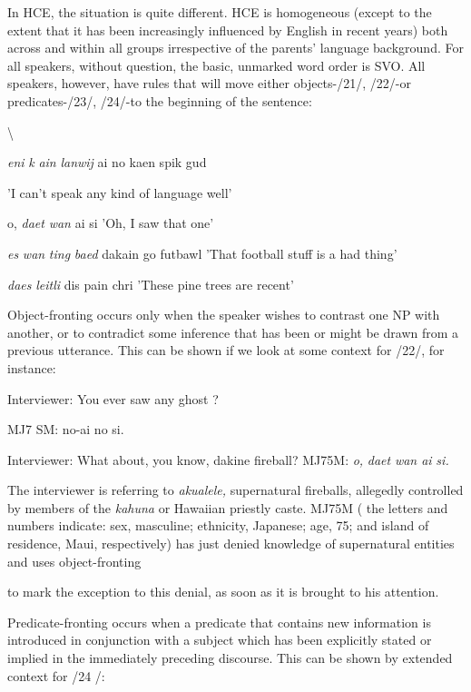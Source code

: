 In HCE, the situation is quite different. HCE is homogeneous (except to the extent that it has been increasingly influenced by English in recent years) both across and within all groups irrespective of the parents' language background. For all speakers, without question, the basic, unmarked word order is SVO. All speakers, however, have rules that will move either objects-/21/, /22/-or predicates-/23/, /24/-to the beginning of the sentence:

{\textbackslash}


\ea\label{ex:21}
 \textit{eni} \textit{k} \textit{ain} \textit{lanwij} ai no kaen spik gud
\glt
\z

'I can't speak any kind of language well'

\ea\label{ex:22}
 o, \textit{daet} \textit{wan} ai si 'Oh, I saw that one'
\glt
\z

\ea\label{ex:23}
 \textit{es} \textit{wan} \textit{ting} \textit{baed} dakain go futbawl 'That football stuff is a had thing'
\glt
\z

\ea\label{ex:24}
 \textit{daes} \textit{leitli} dis pain chri 'These pine trees are recent'
\glt
\z

Object-fronting occurs only when the speaker wishes to contrast one NP with another, or to contradict some inference that has been or might be drawn from a previous utterance. This can be shown if we look at some context for /22/, for instance:

\ea\label{ex:25}
 Interviewer: You ever saw any ghost ?
\glt
\z

MJ7 SM: no-ai no si.

Interviewer: What about, you know, dakine fireball? MJ75M: \textit{o,} \textit{daet} \textit{wan ai} \textit{si.}

The interviewer is referring to \textit{akualele,} supernatural fireballs, allegedly controlled by members of the \textit{kahuna} or Hawaiian priestly caste. MJ75M ( the letters and numbers indicate: sex, masculine; ethnicity, Japanese; age, 75; and island of residence, Maui, respectively) has just denied knowledge of supernatural entities and uses object-fronting

to mark the exception to this denial, as soon as it is brought to his attention.

Predicate-fronting occurs when a predicate that contains new information is introduced in conjunction with a subject which has been explicitly stated or implied in the immediately preceding discourse. This can be shown by extended context for /24 /:

